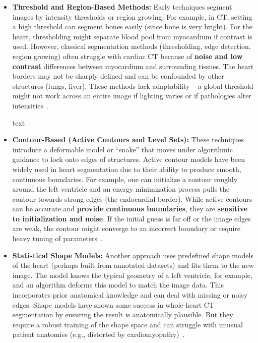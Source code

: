 \documentclass[12pt, BSc]{muthesis}
\begin{document}
\begin{itemize}
\item \textbf{Threshold and Region-Based Methods:} Early techniques segment images by intensity thresholds or region growing. For example, in CT, setting a high threshold can segment bones easily (since bone is very bright). For the heart, thresholding might separate blood pool from myocardium if contrast is used. However, classical segmentation methods (thresholding, edge detection, region growing) often struggle with cardiac CT because of \textbf{noise and low contrast} differences between myocardium and surrounding tissues. The heart borders may not be sharply defined and can be confounded by other structures (lungs, liver). These methods lack adaptability – a global threshold might not work across an entire image if lighting varies or if pathologies alter intensities~\cite{kazemifar2014automated, Juergens2008Automated}.

text
\item \textbf{Contour-Based (Active Contours and Level Sets):} These techniques introduce a deformable model or “snake” that moves under algorithmic guidance to lock onto edges of structures. Active contour models have been widely used in heart segmentation due to their ability to produce smooth, continuous boundaries. For example, one can initialize a contour roughly around the left ventricle and an energy minimization process pulls the contour towards strong edges (the endocardial border). While active contours can be accurate and \textbf{provide continuous boundaries}, they are \textbf{sensitive to initialization and noise}. If the initial guess is far off or the image edges are weak, the contour might converge to an incorrect boundary or require heavy tuning of parameters~\cite{ barba2013comparative, Chen2024Automatic}.

\item \textbf{Statistical Shape Models:} Another approach uses predefined shape models of the heart (perhaps built from annotated datasets) and fits them to the new image. The model knows the typical geometry of a left ventricle, for example, and an algorithm deforms this model to match the image data. This incorporates prior anatomical knowledge and can deal with missing or noisy edges. Shape models have shown some success in whole-heart CT segmentation by ensuring the result is anatomically plausible. But they require a robust training of the shape space and can struggle with unusual patient anatomies (e.g., distorted by cardiomyopathy)~\cite{COOTES199538, ordas2007statistical}.


\end{itemize}
\end{document}
